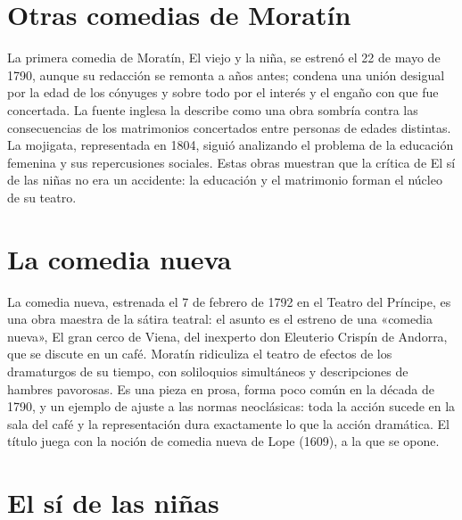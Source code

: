 \documentclass{book}
\begin{document}

\section{Otras comedias de Moratín}

La primera comedia de Moratín, El viejo y la niña, se estrenó el 22 de mayo de 1790, aunque su redacción se remonta a años antes; condena una unión desigual por la edad de los cónyuges y sobre todo por el interés y el engaño con que fue concertada. La fuente inglesa la describe como una obra sombría contra las consecuencias de los matrimonios concertados entre personas de edades distintas. La mojigata, representada en 1804, siguió analizando el problema de la educación femenina y sus repercusiones sociales. Estas obras muestran que la crítica de El sí de las niñas no era un accidente: la educación y el matrimonio forman el núcleo de su teatro.


\section{La comedia nueva}

La comedia nueva, estrenada el 7 de febrero de 1792 en el Teatro del Príncipe, es una obra maestra de la sátira teatral: el asunto es el estreno de una «comedia nueva», El gran cerco de Viena, del inexperto don Eleuterio Crispín de Andorra, que se discute en un café. Moratín ridiculiza el teatro de efectos de los dramaturgos de su tiempo, con soliloquios simultáneos y descripciones de hambres pavorosas. Es una pieza en prosa, forma poco común en la década de 1790, y un ejemplo de ajuste a las normas neoclásicas: toda la acción sucede en la sala del café y la representación dura exactamente lo que la acción dramática. El título juega con la noción de comedia nueva de Lope (1609), a la que se opone.


\section{El sí de las niñas}
\end{document}

